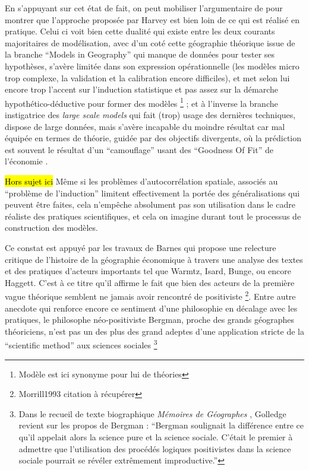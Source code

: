 En s'appuyant sur cet état de fait, on peut mobiliser l'argumentaire de \textcite{Wilson1972} pour montrer que l'approche proposée par Harvey est bien loin de ce qui est réalisé en pratique. Celui ci voit bien cette dualité qui existe entre les deux courants majoritaires de modélisation, avec d'un coté cette géographie théorique issue de la branche \foreignquote{english}{Models in Geography} qui manque de données pour tester ses hypothèses, s'avère limitée dans son expression opérationnelle (les modèles micro trop complexe, la validation et la calibration encore difficiles), et met selon lui encore trop l'accent sur l'induction statistique et pas assez sur la démarche hypothético-déductive pour former des modèles \footnote{Modèle est ici synonyme pour lui de théories} ; et à l'inverse la branche instigatrice des \textit{large scale models} qui fait (trop) usage des dernières techniques, dispose de large données, mais s'avère incapable du moindre résultat car mal équipée en termes de théorie, guidée par des objectifs divergents, où la prédiction est souvent le résultat d'un \enquote{camouflage} usant des \foreignquote{english}{Goodness Of Fit} de l'économie \autocite[10]{Batty1994}.

\hl{Hors sujet ici }
Même si les problèmes d'autocorrélation spatiale, associés au \enquote{problème de l'induction} limitent effectivement la portée des généralisations qui peuvent être faites, cela n’empêche absolument pas son utilisation dans le cadre réaliste des pratiques scientifiques, et cela on imagine durant tout le processus de construction des modèles.


Ce constat est appuyé par les travaux de Barnes qui propose une relecture critique de l'histoire de la géographie économique \autocite[122]{Barnes1996} à travers une analyse des textes et des pratiques d'acteurs importants tel que Warmtz, Isard, Bunge, ou encore Haggett. C'est à ce titre qu'il affirme \autocite{Barnes2001a} le fait que bien des acteurs de la première vague théorique semblent ne jamais avoir rencontré de positiviste \footnote{Morrill1993 citation à récupérer}. Entre autre anecdote qui renforce encore ce sentiment d'une philosophie en décalage avec les pratiques, le philosophe néo-positiviste Bergman, proche des grands géographes théoriciens, n'est pas un des plus des grand adeptes d'une application stricte de la \foreignquote{english}{scientific method} aux sciences sociales \footnote{Dans le recueil de texte biographique \textit{Mémoires de Géographes} \textcite[96]{Bailly2000}, Golledge revient sur les propos de Bergman : \enquote{Bergman soulignait la différence entre ce qu'il appelait alors la science pure et la science sociale. C'était le premier à admettre que l'utilisation des procédés logiques positivistes dans la science sociale pourrait se révéler extrêmement improductive.} } 

